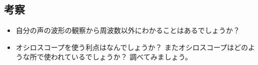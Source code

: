 \newpage


\vspace{7cm}


\subsection*{考察}

\begin{itemize}

\item 自分の声の波形の観察から周波数以外にわかることはあるでしょうか？

\vspace{5cm}

\item オシロスコープを使う利点はなんでしょうか？ またオシロスコープはどのような所で使われているでしょうか？ 調べてみましょう。

\end{itemize}

